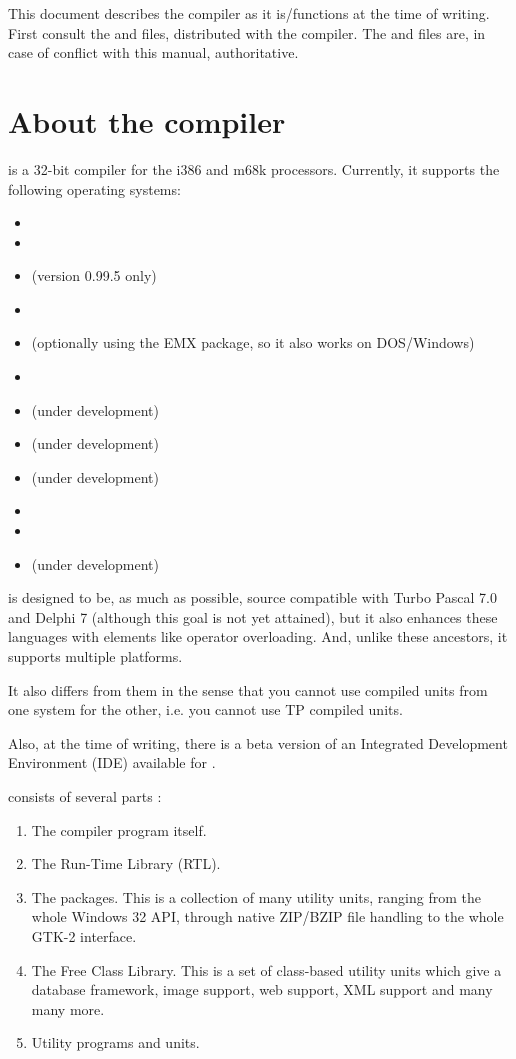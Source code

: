This document describes the compiler as it is/functions at the time of
writing. First consult the  and  files, distributed 
with the compiler. The  and  files are, in case of 
conflict with this manual, authoritative.

\section{About the compiler}
\fpc is a 32-bit compiler for the i386 and m68k processors. Currently, 
it supports the following operating systems:
\begin{itemize}
\item \dos
\item \linux %
\item \amiga (version 0.99.5 only)
\item \windows
\item \ostwo (optionally using the EMX package, so it also works on DOS/Windows)
\item \freebsd
\item \beos (under development)
\item \solaris (under development)
\item \palmos (under development)
\item \netbsd 
\item \netware
\item \openbsd (under development)
\end{itemize}

\fpc is designed to be, as much as possible, source compatible with
Turbo Pascal 7.0 and Delphi 7 (although this goal is not yet attained),
but it also enhances these languages with elements like operator overloading.
And, unlike these ancestors, it supports multiple platforms.

It also differs from them in the sense that you cannot use compiled units
from one system for the other, i.e. you cannot use TP compiled units.

Also, at the time of writing, there is a beta version of an
Integrated Development Environment (IDE) available for \fpc.

\fpc consists of several parts :
\begin{enumerate}
\item The compiler program itself.
\item The Run-Time Library (RTL).
\item The packages. This is a collection of many utility units, ranging from
the whole Windows 32 API, through native ZIP/BZIP file handling to the whole GTK-2 interface.
\item The Free Class Library. This is a set of class-based utility units which give
a database framework, image support, web support, XML support and many many more.
\item Utility programs and units.
\end{enumerate}

